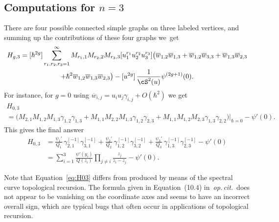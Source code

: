 \subsection{Computations for \texorpdfstring{$n=3$}{n=3}}
There are four possible connected simple graphs on three labeled vertices, and summing up the contributions of these four graphs we~get
\begin{multline*}
H_{g,3} =[\hbar^{2g}]\sum_{r_1,r_2,r_3=1}^\infty M_{r_1,1} M_{r_2,2} M_{r_3,3}[u_1^{r_1}u_2^{r_2}u_3^{r_3}]
\bigl(\overline w_{1,2}\overline w_{1,3}+\overline w_{1,2}\overline w_{3,3}+\overline w_{1,3}\overline w_{2,3}
\\
+\hbar^2 \overline w_{1,2}\overline w_{1,3}\overline w_{2,3}\bigr)
- [u^{2g}]\,\frac1{\cS^2(u)}\psi^{(2g+1)}(0).
\end{multline*}
For instance, for $g=0$ using $\overline w_{i,j}=u_iu_j\gamma_{i,j}+O(\hbar^2)$ we get\vspace*{-5pt}
\begin{multline*}
H_{0,3}\\
=\bigl(M_{2,1}M_{1,2}M_{1,3}\gamma_{1,2}\gamma_{1,3}+
M_{1,1}M_{2,2}M_{1,3}\gamma_{1,2}\gamma_{2,3}+
M_{1,1}M_{1,2}M_{2,3}\gamma_{1,3}\gamma_{2,2}\bigr)\big|_{\hbar=0}-\psi'(0).
\end{multline*}
This gives the final answer
\begin{equation}\label{eq:H03}
\begin{aligned}
H_{0,3}&=
\frac{\psi_1'}{Q_1}\,\gamma_{2,1}^{[-1]}\gamma_{3,1}^{[-1]}
+\frac{\psi_2'}{Q_2}\,\gamma_{1,2}^{[-1]}\gamma_{3,2}^{[-1]}
+\frac{\psi_3'}{Q_3}\,\gamma_{1,3}^{[-1]}\gamma_{2,3}^{[-1]}
-\psi'(0)\\
&=
\sum_{i=1}^3\frac{\psi'(y_i)}{Q(z_i)}\prod_{j\ne i}\frac{z_j}{z_i-z_j}-\psi'(0).
\end{aligned}
\end{equation}
\begin{remark} Note that Equation~\eqref{eq:H03} differs from \cite[Prop.\,10.2 \& Eq.\,(10.4)]{ACEH-2} produced by means of the spectral curve topological recursion. The formula given in Equation~(10.4) in~\emph{op.\,cit.}\ does not appear to be vanishing on the coordinate axes and seems to have an incorrect overall sign, which are typical bugs that often occur in applications of topological recursion.
\end{remark}

